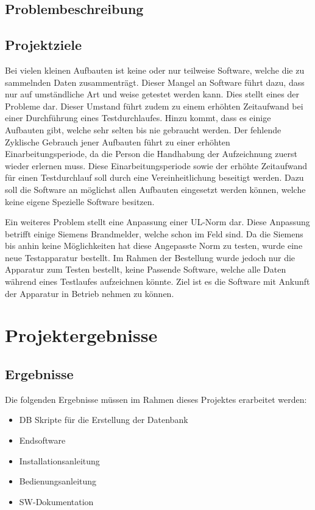 \documentclass[10pt]{scrartcl}
\begin{document}
\subsection{Problembeschreibung}
\subsection{Projektziele}
Bei vielen kleinen Aufbauten ist keine oder nur teilweise Software, welche die zu sammelnden Daten zusammenträgt. Dieser Mangel an Software führt dazu, dass nur auf umständliche Art und weise getestet werden kann. Dies stellt eines der Probleme dar. Dieser Umstand führt zudem zu einem erhöhten Zeitaufwand bei einer Durchführung eines Testdurchlaufes. Hinzu kommt, dass es einige Aufbauten gibt, welche sehr selten bis nie gebraucht werden. Der fehlende Zyklische Gebrauch jener Aufbauten führt zu einer erhöhten Einarbeitungsperiode, da die Person die Handhabung der Aufzeichnung zuerst wieder erlernen muss. Diese Einarbeitungsperiode sowie der erhöhte Zeitaufwand für einen Testdurchlauf soll durch eine Vereinheitlichung beseitigt werden. Dazu soll die Software an möglichst allen Aufbauten eingesetzt werden können, welche keine eigene Spezielle Software besitzen.

Ein weiteres Problem stellt eine Anpassung einer \gls{UL}-Norm dar. Diese Anpassung betrifft einige Siemens Brandmelder, welche schon im Feld sind. Da die Siemens bis anhin keine Möglichkeiten hat diese Angepasste Norm zu testen, wurde eine neue Testapparatur bestellt. Im Rahmen der Bestellung wurde jedoch nur die Apparatur zum Testen bestellt, keine Passende Software, welche alle Daten während eines Testlaufes aufzeichnen könnte. Ziel ist es die Software mit Ankunft der Apparatur in Betrieb nehmen zu können.
\section{Projektergebnisse}
\subsection{Ergebnisse}
Die folgenden Ergebnisse müssen im Rahmen dieses Projektes erarbeitet werden:
\begin{itemize}
	\item DB Skripte für die Erstellung der Datenbank
	\item Endsoftware
	\item Installationsanleitung
	\item Bedienungsanleitung
	\item SW-Dokumentation
\end{itemize}
\end{document}
